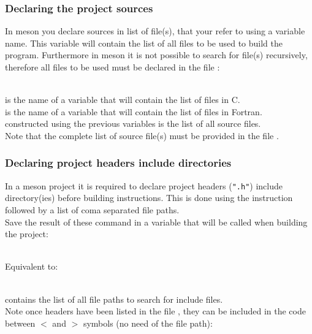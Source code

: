 \subsubsection*{Declaring the project sources}

In meson you declare sources in list of file(s), that your refer to using a variable name. 
This variable will contain the list of all files to be used to build the program. 
Furthermore in meson it is not possible to search for file(s) recursively, therefore all files to be used must be declared in the file :
\begin{script}
\end{script}
\\[-0.5cm]
\noindent {} is the name of a variable that will contain the list of files in C. \\[0.25cm]
 is the name of a variable that will contain the list of files in Fortran. \\[0.25cm]
 constructed using the previous variables is the list of all source files. \\[0.25cm]
Note that the complete list of source file(s) must be provided in the file . 

\subsubsection*{Declaring project headers include directories}

In a meson project it is required to declare project headers (\texttt{".h"}) include directory(ies) before building instructions. 
This is done using the  instruction followed by a list of coma separated file paths. \\
Save the result of these command in a variable that will be called when building the project:
\vspace{-0.25cm}
\begin{script}
 
\end{script}
\\[-0.75cm]
Equivalent to:
\vspace{-0.125cm}
\begin{script}
 
\end{script}
\\[-0.25cm]
\noindent {} contains the list of all file paths to search for include files. \\
Note once headers have been listed in the file , they can be included in the code between $<$ and $>$ symbols (no need of the file path):
\begin{script}
\end{script}
\newpage

